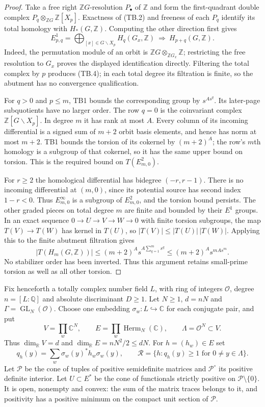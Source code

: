 \begin{proof}
Take a free right $\mathbb ZG$-resolution $P_\bullet$ of $\mathbb Z$
and form the first-quadrant double complex
$P_q\otimes_{\mathbb ZG}\mathbb Z[X_p]$.  Exactness of (TB.2)
and freeness of each $P_q$ identify its total homology with
$H_*(G,\mathbb Z)$.  Computing the other direction first gives
\[
 E^1_{p,q}=\bigoplus_{[x]\in G\backslash X_p}
                    H_q(G_x,\mathbb Z)
       \ \Longrightarrow\ H_{p+q}(G,\mathbb Z).
 \tag{TB.4}
\]
Indeed, the permutation module of an orbit is
$\mathbb ZG\otimes_{\mathbb ZG_x}\mathbb Z$; restricting the free
resolution to $G_x$ proves the displayed identification directly.
Filtering the total complex by $p$ produces (TB.4); in each total
degree its filtration is finite, so the abutment has no convergence
qualification.

For $q>0$ and $p\le m$, TB1 bounds the corresponding group by
$s^{A s^q}$.  Its later-page subquotients have no larger order.
The row $q=0$ is the coinvariant complex
$\mathbb Z[G\backslash X_p]$.  In degree $m$ it has rank at most
$A$.  Every column of its incoming differential is a signed sum
of $m+2$ orbit basis elements, and hence has norm at most $m+2$.
TB1 bounds the torsion of its cokernel by $(m+2)^A$; the row's
$m$th homology is a subgroup of that cokernel, so it has the same
upper bound on torsion.  This is the required bound on
$T(E^2_{m,0})$.

For $r\ge2$ the homological differential has bidegree $(-r,r-1)$.
There is no incoming differential at $(m,0)$, since its potential
source has second index $1-r<0$.  Thus $E^\infty_{m,0}$ is a
subgroup of $E^2_{m,0}$, and the torsion bound persists.  The other
graded pieces on total degree $m$ are finite and bounded by their
$E^1$ groups.  In an exact sequence $0\to U\to V\to W\to0$ with
finite torsion subgroups, the map $T(V)\to T(W)$ has kernel in
$T(U)$, so $|T(V)|\le |T(U)|\,|T(W)|$.  Applying this to the
finite abutment filtration gives
\[
 |T(H_m(G,\mathbb Z))|
 \le (m+2)^A s^{A\sum_{q=1}^m s^q}
 \le (m+2)^A s^{m A s^m}.
\]
No stabilizer order has been inverted.  Thus this argument retains
small-prime torsion as well as all other torsion.
\end{proof}

Fix henceforth a totally complex number field $L$, with ring of
integers $\mathcal O$, degree $n=[L:\mathbb Q]$ and absolute
discriminant $D\ge1$.  Let $N\ge1$, $d=nN$ and
$\Gamma=\operatorname{GL}_N(\mathcal O)$.  Choose one embedding
$\sigma_w:L\hookrightarrow\mathbb C$ for each conjugate pair,
and put
\[
 V=\prod_w\mathbb C^N,\qquad
 E=\prod_w\operatorname{Herm}_N(\mathbb C),\qquad
 \Lambda=\mathcal O^N\subset V.
 \tag{TB.5}
\]
Thus $\dim_{\mathbb R}V=d$ and
$\dim_{\mathbb R}E=nN^2/2\le dN$.  For $h=(h_w)\in E$ set
\[
 q_h(y)=\sum_w \sigma_w(y)^*h_w\sigma_w(y),\qquad
 \mathcal R=\{h:q_h(y)\ge1\text{ for }0\ne y\in\Lambda\}.
 \tag{TB.6}
\]
Let $\mathcal P$ be the cone of tuples of positive semidefinite
matrices and $\mathcal P^\circ$ its positive definite interior.
Let $U\subset E^*$ be the cone of functionals strictly positive
on $\mathcal P\setminus\{0\}$.  It is open, nonempty and convex:
the sum of the matrix traces belongs to it, and positivity has a
positive minimum on the compact unit section of $\mathcal P$.

